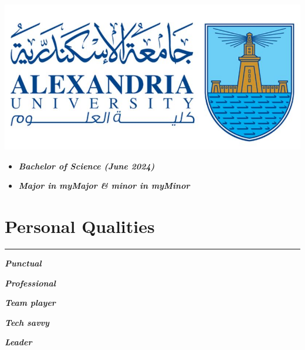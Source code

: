 \documentclass[10pt]{article}
\newcommand{\fancy}[1]{\Large\textbf{\textit{#1}}}
\begin{document}

\noindent
\begin{minipage}{0.3\textwidth}
\vspace{1em}
\begin{center}
    \includegraphics[width=\textwidth]{FOS_logo.jpg}
\end{center}
\end{minipage}
\hspace{-2pt}
\begin{minipage}{0.7\textwidth}
\vspace{2em}
\begin{center}
    \begin{itemize}
        \item \large \fancy{Bachelor of Science (June 2024)}
    \end{itemize}
    \begin{itemize}
        \item \large \fancy{Major in myMajor \& minor in myMinor}
    \end{itemize}
\end{center}
\end{minipage}

\vspace{1em}
\section*{Personal Qualities}
\hrule
\vspace{1em}
\begin{itemize*}
\item \fancy{Punctual \quad\quad}
\item \fancy{Professional \quad\quad}
\item \fancy{Team player \quad\quad}
\item \fancy{Tech savvy \quad\quad}
\item \fancy{Leader}
\end{itemize*}
\end{document}
